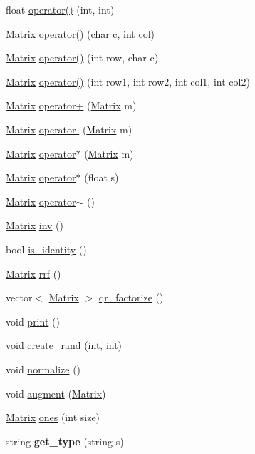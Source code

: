 \begin{DoxyCompactItemize}
\item 
float \hyperlink{classMatrix_a7cfbee0a259ddd270b2dce9dcccd1c1f}{operator()} (int, int)
\item 
\hyperlink{classMatrix}{Matrix} \hyperlink{classMatrix_a1b3509cd7326747a64593f02e0928073}{operator()} (char c, int col)
\item 
\hyperlink{classMatrix}{Matrix} \hyperlink{classMatrix_adb1820ca9023dd15f2d1da53d3f958dc}{operator()} (int row, char c)
\item 
\hyperlink{classMatrix}{Matrix} \hyperlink{classMatrix_a1c1c85330ba4a4037b4926e818ab9f02}{operator()} (int row1, int row2, int col1, int col2)
\item 
\hyperlink{classMatrix}{Matrix} \hyperlink{classMatrix_a0dbbe5a4d7882f3fdbc59f1eba0e0ee2}{operator+} (\hyperlink{classMatrix}{Matrix} m)
\item 
\hyperlink{classMatrix}{Matrix} \hyperlink{classMatrix_a2aabf841a4302d528f8b102c0800a263}{operator-\/} (\hyperlink{classMatrix}{Matrix} m)
\item 
\hyperlink{classMatrix}{Matrix} \hyperlink{classMatrix_a5e36ae40c3b2863ffd80154a9b0c3012}{operator$\ast$} (\hyperlink{classMatrix}{Matrix} m)
\item 
\hyperlink{classMatrix}{Matrix} \hyperlink{classMatrix_a2054a88f24c32d711492431afd11a5cf}{operator$\ast$} (float s)
\item 
\hyperlink{classMatrix}{Matrix} \hyperlink{classMatrix_aff3fd507bacd00a00d0afa93d134bcd8}{operator$\sim$} ()
\item 
\hyperlink{classMatrix}{Matrix} \hyperlink{classMatrix_a7611488b98f9c291c86cb2ea47b1b56a}{inv} ()
\item 
bool \hyperlink{classMatrix_aeffea08696edf6d19b8b387e8f51b060}{is\-\_\-identity} ()
\item 
\hyperlink{classMatrix}{Matrix} \hyperlink{classMatrix_af3fa02d37acad394314032e0137d09a3}{rrf} ()
\item 
vector$<$ \hyperlink{classMatrix}{Matrix} $>$ \hyperlink{classMatrix_a80f03495bcd57c2f4c3ae7547c41850c}{qr\-\_\-factorize} ()
\item 
void \hyperlink{classMatrix_a99ba97122b8fdd54e95290caf80fc8e2}{print} ()
\item 
void \hyperlink{classMatrix_a3de72fdeb6f399497882a8f775b29460}{create\-\_\-rand} (int, int)
\item 
void \hyperlink{classMatrix_a00ff4e77d40160c2d3c1f7082abff2c6}{normalize} ()
\item 
void \hyperlink{classMatrix_aeea86d1b9f23af32d881438b369f7994}{augment} (\hyperlink{classMatrix}{Matrix})
\item 
\hyperlink{classMatrix}{Matrix} \hyperlink{classMatrix_a88e35d98ec8d1d26c6a39cb07f1d4ea4}{ones} (int size)
\item 
\hypertarget{classMatrix_abe40aae47d83742914e556cbd436345e}{string {\bfseries get\-\_\-type} (string s)}\label{classMatrix_abe40aae47d83742914e556cbd436345e}


\end{DoxyCompactItemize}
